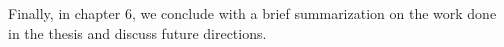 \documentclass[MS,synopsis]{iitmdiss}
\begin{document}
Finally, in chapter 6, we conclude with a brief summarization on the work done in the thesis and discuss future directions. 







\end{document}
